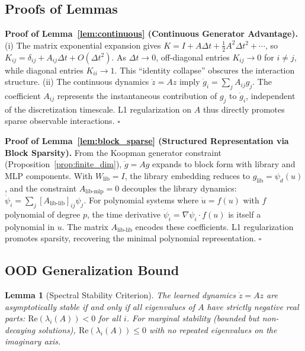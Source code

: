 \documentclass{article}
\newtheorem{lemma}{Lemma}
\theoremstyle{remark}
\begin{document}
\subsection{Proofs of Lemmas}
\label{app:proofs_lemmas}

\textbf{Proof of Lemma~\ref{lem:continuous} (Continuous Generator Advantage).}
(i) The matrix exponential expansion gives $K = I + A\Delta t + \frac{1}{2}A^2\Delta t^2 + \cdots$, so $K_{ij} = \delta_{ij} + A_{ij}\Delta t + O(\Delta t^2)$. As $\Delta t \to 0$, off-diagonal entries $K_{ij} \to 0$ for $i \neq j$, while diagonal entries $K_{ii} \to 1$. This ``identity collapse'' obscures the interaction structure.
(ii) The continuous dynamics $\dot{z} = Az$ imply $\dot{g}_i = \sum_j A_{ij} g_j$. The coefficient $A_{ij}$ represents the instantaneous contribution of $g_j$ to $\dot{g}_i$, independent of the discretization timescale. L1 regularization on $A$ thus directly promotes sparse observable interactions. $\square$

\textbf{Proof of Lemma~\ref{lem:block_sparse} (Structured Representation via Block Sparsity).}
From the Koopman generator constraint (Proposition~\ref{prop:finite_dim}), $\dot{g} = Ag$ expands to block form with library and MLP components. With $W_{\text{lib}} = I$, the library embedding reduces to $g_{\text{lib}} = \psi_d(u)$, and the constraint $A_{\text{lib-mlp}} = 0$ decouples the library dynamics: $\dot{\psi}_i = \sum_j [A_{\text{lib-lib}}]_{ij} \psi_j$. For polynomial systems where $\dot{u} = f(u)$ with $f$ polynomial of degree $p$, the time derivative $\dot{\psi}_i = \nabla\psi_i \cdot f(u)$ is itself a polynomial in $u$. The matrix $A_{\text{lib-lib}}$ encodes these coefficients. L1 regularization promotes sparsity, recovering the minimal polynomial representation. $\square$

\subsection{OOD Generalization Bound}
\label{app:proofs_ood}

\begin{lemma}[Spectral Stability Criterion]
\label{lem:spectral_stability}
The learned dynamics $\dot{z} = Az$ are asymptotically stable if and only if all eigenvalues of $A$ have strictly negative real parts: $\text{Re}(\lambda_i(A)) < 0$ for all $i$. For marginal stability (bounded but non-decaying solutions), $\text{Re}(\lambda_i(A)) \leq 0$ with no repeated eigenvalues on the imaginary axis.
\end{lemma}
\end{document}
